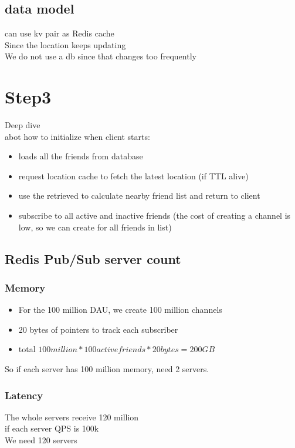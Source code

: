 \documentclass{article}
\begin{document}
\subsection{data model}
can use kv pair as Redis cache\\
Since the location keeps updating\\
We do not use a db since that changes too frequently
\section{Step3}
Deep dive\\
abot how to initialize when client starts:\\
\begin{itemize}
    \item loads all the friends from database\\
    \item request location cache to fetch the latest location (if TTL alive)
    \item use the retrieved to calculate nearby friend list and return to client\\
    \item subscribe to all active and inactive friends (the cost of creating a channel is low, so we can create for all friends in list)
\end{itemize}
\subsection{Redis Pub/Sub server count}
\subsubsection{Memory}
\begin{itemize}
    \item For the 100 million DAU, we create 100 million channels
    \item 20 bytes of pointers to track each subscriber
    \item total $100 million * 100 active friends * 20 bytes = 200 GB$
\end{itemize}
So if each server has 100 million memory, need 2 servers.
\subsubsection{Latency}
The whole servers receive 120 million\\
if each server QPS is 100k\\
We need 120 servers\\
\end{document}
